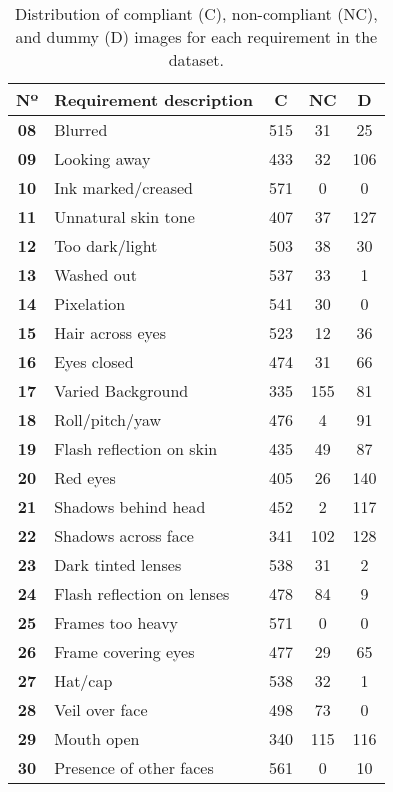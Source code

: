 \begin{table}[t]
\centering
\caption{Distribution of compliant (C), non-compliant (NC), and dummy (D) images for each requirement in the \ficvtest dataset.}
\label{tab:req-dist-ficv-test}
\begin{tabular}{clccc}
\hline
\textbf{Nº} & \multicolumn{1}{c}{\textbf{Requirement description}} & \textbf{C} & \textbf{NC} & \textbf{D} \\ \hline
\textbf{08} & Blurred & 515 & 31 & 25 \\
\textbf{09} & Looking away & 433 & 32 & 106 \\
\textbf{10} & Ink marked/creased & 571 & 0 & 0 \\
\textbf{11} & Unnatural skin tone & 407 & 37 & 127 \\
\textbf{12} & Too dark/light & 503 & 38 & 30 \\
\textbf{13} & Washed out & 537 & 33 & 1 \\
\textbf{14} & Pixelation & 541 & 30 & 0 \\
\textbf{15} & Hair across eyes & 523 & 12 & 36 \\
\textbf{16} & Eyes closed & 474 & 31 & 66 \\
\textbf{17} & Varied Background & 335 & 155 & 81 \\
\textbf{18} & Roll/pitch/yaw & 476 & 4 & 91 \\
\textbf{19} & Flash reflection on skin & 435 & 49 & 87 \\
\textbf{20} & Red eyes & 405 & 26 & 140 \\
\textbf{21} & Shadows behind head & 452 & 2 & 117 \\
\textbf{22} & Shadows across face & 341 & 102 & 128 \\
\textbf{23} & Dark tinted lenses & 538 & 31 & 2 \\
\textbf{24} & Flash reflection on lenses & 478 & 84 & 9 \\
\textbf{25} & Frames too heavy & 571 & 0 & 0 \\
\textbf{26} & Frame covering eyes & 477 & 29 & 65 \\
\textbf{27} & Hat/cap & 538 & 32 & 1 \\
\textbf{28} & Veil over face & 498 & 73 & 0 \\
\textbf{29} & Mouth open & 340 & 115 & 116 \\
\textbf{30} & Presence of other faces & 561 & 0 & 10 \\ \hline
\end{tabular}
\end{table}